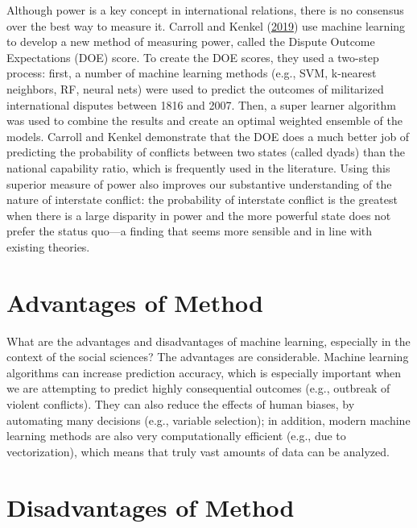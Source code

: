\documentclass{book}
\begin{document}
Although power is a key concept in international relations, there is no
consensus over the best way to measure it. Carroll and Kenkel
(\protect\hyperlink{ref-carroll2019a}{2019}) use machine learning to develop a
new method of measuring power, called the Dispute Outcome Expectations (DOE)
score. To create the DOE scores, they used a two-step process: first, a number
of machine learning methods (e.g., SVM, k-nearest neighbors, RF, neural nets)
were used to predict the outcomes of militarized international disputes
between 1816 and 2007. Then, a super learner algorithm was used to combine the
results and create an optimal weighted ensemble of the models. Carroll and
Kenkel demonstrate that the DOE does a much better job of predicting the
probability of conflicts between two states (called dyads) than the national
capability ratio, which is frequently used in the literature. Using this
superior measure of power also improves our substantive understanding of the
nature of interstate conflict: the probability of interstate conflict is the
greatest when there is a large disparity in power and the more powerful state
does not prefer the status quo---a finding that seems more sensible and in
line with existing theories.

\hypertarget{advantages-of-method-4}{%
\section{Advantages of Method}\label{advantages-of-method-4}}

What are the advantages and disadvantages of machine learning, especially in
the context of the social sciences? The advantages are considerable. Machine
learning algorithms can increase prediction accuracy, which is especially
important when we are attempting to predict highly consequential outcomes
(e.g., outbreak of violent conflicts). They can also reduce the effects of
human biases, by automating many decisions (e.g., variable selection); in
addition, modern machine learning methods are also very computationally
efficient (e.g., due to vectorization), which means that truly vast amounts of
data can be analyzed.

\hypertarget{disadvantages-of-method-2}{%
\section{Disadvantages of Method}\label{disadvantages-of-method-2}}
\end{document}
